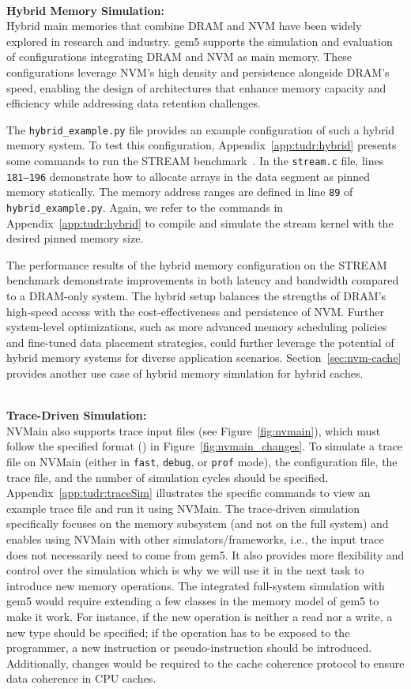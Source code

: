 ~\\\noindent \textbf{Hybrid Memory Simulation:}\\
Hybrid main memories that combine DRAM and NVM have been widely explored in research and industry. gem5 supports the simulation and evaluation of configurations integrating DRAM and NVM as main memory. These configurations leverage NVM's high density and persistence alongside DRAM's speed, enabling the design of architectures that enhance memory capacity and efficiency while addressing data retention challenges.

The \texttt{hybrid\_example.py} file provides an example configuration of such a hybrid memory system.
To test this configuration, Appendix~\cref{app:tudr:hybrid} presents some commands to run the STREAM benchmark~\cite{stream_bench}.
In the \texttt{stream.c} file, lines \texttt{181–196} demonstrate how to allocate arrays in the data segment as pinned memory statically. The memory address ranges are defined in line \texttt{89} of \texttt{hybrid\_example.py}.
Again, we refer to the commands in Appendix~\cref{app:tudr:hybrid} to compile and simulate the stream kernel with the desired pinned memory size.


The performance results of the hybrid memory configuration on the STREAM benchmark demonstrate improvements in both latency and bandwidth compared to a DRAM-only system. The hybrid setup balances the strengths of DRAM’s high-speed access with the cost-effectiveness and persistence of NVM. 
Further system-level optimizations, such as more advanced memory scheduling policies and fine-tuned data placement strategies, could further leverage the potential of hybrid memory systems for diverse application scenarios.
Section~\ref{sec:nvm-cache} provides another use case of hybrid memory simulation for hybrid caches.

~\\\noindent \textbf{Trace-Driven Simulation:}\\
NVMain also supports trace input files (see Figure~\ref{fig:nvmain}), which must follow the specified format () in Figure~\ref{fig:nvmain_changes}.
To simulate a trace file on NVMain (either in \texttt{fast}, \texttt{debug}, or \texttt{prof} mode), the configuration file, the trace file, and the number of simulation cycles should be specified.
Appendix~\cref{app:tudr:traceSim} illustrates the specific commands to view an example trace file and run it using NVMain. The trace-driven simulation specifically focuses on the memory subsystem (and not on the full system) and enables using NVMain with other simulators/frameworks, i.e., the input trace does not necessarily need to come from gem5. It also provides more flexibility and control over the simulation which is why we will use it in the next task to introduce new memory operations. 
The integrated full-system simulation with gem5 would require extending a few classes in the memory model of gem5 to make it work. For instance, if the new operation is neither a read nor a write, a new type should be specified; if the operation has to be exposed to the programmer, a new instruction or pseudo-instruction should be introduced.
Additionally, changes would be required to the cache coherence protocol to ensure data coherence in CPU caches. 

